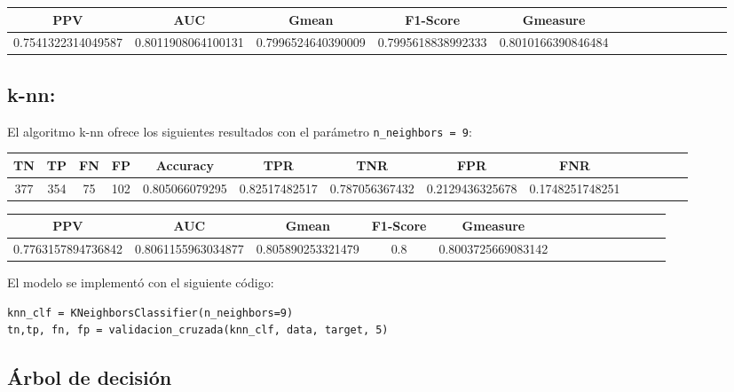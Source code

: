 \documentclass[a4]{article}
\begin{document}
\begin{center}
\begin{tabular}{|c|c|c|c|c|c|c|c|c|c|c|c|c|c|}
\hline
\multicolumn{1}{|c|}{\textbf{PPV}} & \textbf{AUC} & \textbf{Gmean} & \textbf{F1-Score} & \textbf{Gmeasure}  \\ \hline
   0.7541322314049587 & 0.8011908064100131 & 0.7996524640390009 & 0.7995618838992333 & 0.8010166390846484 \\ \hline
\end{tabular}
\end{center}


\subsection{k-nn:}

El algoritmo k-nn ofrece los siguientes resultados con el parámetro \texttt{n\_neighbors = 9}:

\begin{center}
\begin{tabular}{|c|c|c|c|c|c|c|c|c|c|c|c|c|c|}
\hline
\multicolumn{1}{|c|}{\textbf{TN}}& \textbf{TP} & \textbf{FN} & \textbf{FP} & \textbf{Accuracy} & \textbf{TPR} & \textbf{TNR} & \textbf{FPR} &\textbf{FNR} \\ \hline
  377 & 354 & 75 & 102 & 0.805066079295 & 0.82517482517 & 0.787056367432 & 0.2129436325678 & 0.1748251748251 \\ \hline
\end{tabular}
\end{center}

\begin{center}
\begin{tabular}{|c|c|c|c|c|c|c|c|c|c|c|c|c|c|}
\hline
\multicolumn{1}{|c|}{\textbf{PPV}} & \textbf{AUC} & \textbf{Gmean} & \textbf{F1-Score} & \textbf{Gmeasure}  \\ \hline
  0.7763157894736842 & 0.8061155963034877 & 0.805890253321479 & 0.8 & 0.8003725669083142  \\ \hline
\end{tabular}
\end{center}
\vspace{5mm}
El modelo se implementó con el siguiente código:

\begin{lstlisting}
knn_clf = KNeighborsClassifier(n_neighbors=9)
tn,tp, fn, fp = validacion_cruzada(knn_clf, data, target, 5)
\end{lstlisting}


\subsection{Árbol de decisión}
\end{document}
